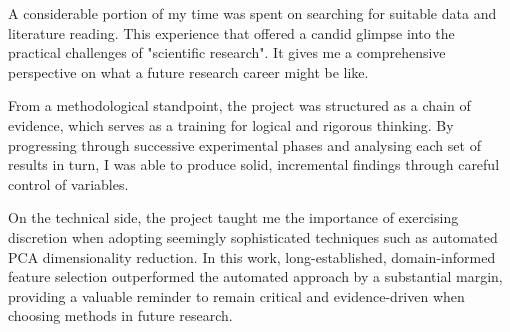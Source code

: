 \documentclass[12pt, a4paper]{article}
\newcommand{\todo}[1]{\textcolor{red}{\textbf{[TODO: #1]}}}
\begin{document}
A considerable portion of my time was spent on searching for suitable data and literature reading. This experience that offered a candid glimpse into the practical challenges of "scientific research". It gives me a comprehensive perspective on what a future research career might be like.

From a methodological standpoint, the project was structured as a chain of evidence, which serves as a training for logical and rigorous thinking. By progressing through successive experimental phases and analysing each set of results in turn, I was able to produce solid, incremental findings through careful control of variables.

On the technical side, the project taught me the importance of exercising discretion when adopting seemingly sophisticated techniques such as automated PCA dimensionality reduction. In this work, long-established, domain-informed feature selection outperformed the automated approach by a substantial margin, providing a valuable reminder to remain critical and evidence-driven when choosing methods in future research.




\newpage



\end{document}
